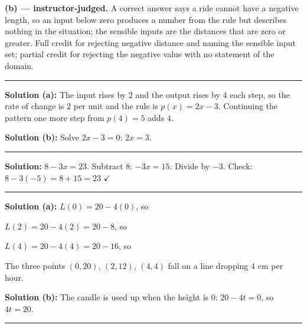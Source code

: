 \documentclass[12pt]{article}
\begin{document}
\textbf{(b) --- instructor-judged.} A correct answer says a ride cannot have a negative length, so an input below zero produces a number from the rule but describes nothing in the situation; the sensible inputs are the distances that are zero or greater. Full credit for rejecting negative distance and naming the sensible input set; partial credit for rejecting the negative value with no statement of the domain.

\vspace{0.2cm}\noindent\rule{\linewidth}{0.2pt}


\textbf{Solution (a):} The input rises by $2$ and the output rises by $4$ each step, so the rate of change is $2$ per unit and the rule is $p(x) = 2x - 3$. Continuing the pattern one more step from $p(4) = 5$ adds $4$. 

\textbf{Solution (b):} Solve $2x - 3 = 0$: $2x = 3$. 

\vspace{0.2cm}\noindent\rule{\linewidth}{0.2pt}


\textbf{Solution:} $8 - 3x = 23$. Subtract $8$: $-3x = 15$. Divide by $-3$. Check: $8 - 3(-5) = 8 + 15 = 23$ $\checkmark$ 

\vspace{0.2cm}\noindent\rule{\linewidth}{0.2pt}


\textbf{Solution (a):} $L(0) = 20 - 4(0)$, so 

$L(2) = 20 - 4(2) = 20 - 8$, so 

$L(4) = 20 - 4(4) = 20 - 16$, so 

The three points $(0,20)$, $(2,12)$, $(4,4)$ fall on a line dropping $4$ cm per hour.

\textbf{Solution (b):} The candle is used up when the height is $0$: $20 - 4t = 0$, so $4t = 20$. 

\vspace{0.2cm}\noindent\rule{\linewidth}{0.2pt}

\end{document}
